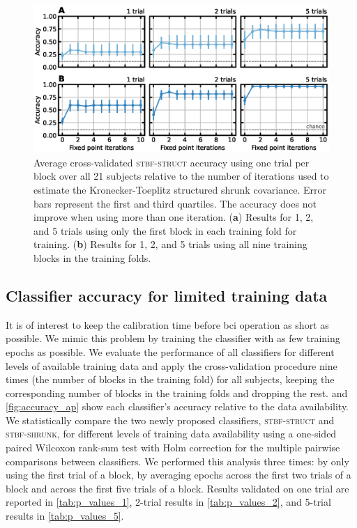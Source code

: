   \begin{figure}
		\includegraphics[width=\linewidth]{figures/stbf_struct/fpi.eps}
    \caption[Average cross-validated \textsc{stbf-struct} accuracy]{%
      Average cross-validated \textsc{stbf-struct} accuracy using
			one trial per block over all 21 subjects
			relative to the number of iterations used to estimate the Kronecker-Toeplitz structured shrunk
			covariance. Error bars represent the first and third quartiles. The
			accuracy does not improve when using more than one iteration.
			(\textbf{a}) Results for 1, 2, and 5 trials using only the first block in each
			training fold for training. (\textbf{b}) Results
			for 1, 2, and 5 trials using
			all nine training blocks in the training folds.
		}
		\label{fig:iterations}
	\end{figure}

	\subsection{Classifier accuracy for limited training data}
	It is of interest to keep the calibration time before \ac{bci}
	operation as short as possible.
	We mimic this problem by training the classifier with as few training epochs as possible.
	We evaluate the performance of all classifiers for different levels of
	available training data and apply the cross-validation procedure nine times (the number of blocks in the training fold) for all subjects, keeping the
	corresponding number of blocks in the training folds and dropping the rest.
	 and \cref{fig:accuracy_ap} show each classifier's
	accuracy relative to the data availability.
	We statistically compare the two newly proposed classifiers,
	\textsc{stbf-struct} and \textsc{stbf-shrunk}, for different levels of training
	data availability using a one-sided paired Wilcoxon rank-sum test with Holm correction for the multiple pairwise comparisons between classifiers.
	We performed this analysis three times: by only using the first trial of a
	block, by averaging epochs across the first two trials of a block and across
	the first five trials of a block.
	Results validated on one trial are reported in \cref{tab:p_values_1}, 2-trial results
	in \cref{tab:p_values_2}, and 5-trial results in \cref{tab:p_values_5}.

